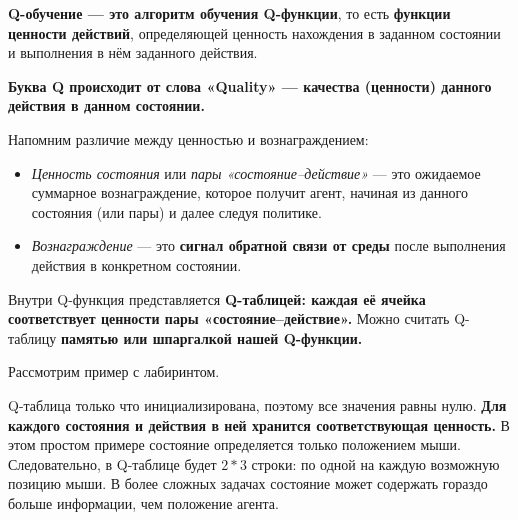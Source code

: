\documentclass[11pt,a4paper]{article}
\begin{document}
\textbf{Q-обучение --- это алгоритм обучения Q-функции}, то есть \textbf{функции ценности действий}, определяющей ценность нахождения в заданном состоянии и выполнения в нём заданного действия.


\textbf{Буква Q происходит от слова «Quality» --- качества (ценности) данного действия в данном состоянии.}

Напомним различие между ценностью и вознаграждением:

\begin{itemize}
\tightlist
\item
  \emph{Ценность состояния} или \emph{пары «состояние--действие»} --- это ожидаемое суммарное вознаграждение, которое получит агент, начиная из данного состояния (или пары) и далее следуя политике.
\item
  \emph{Вознаграждение} --- это \textbf{сигнал обратной связи от среды} после выполнения действия в конкретном состоянии.
\end{itemize}

Внутри Q-функция представляется \textbf{Q-таблицей: каждая её ячейка соответствует ценности пары «состояние--действие».} Можно считать Q-таблицу \textbf{памятью или шпаргалкой нашей Q-функции.}

Рассмотрим пример с лабиринтом.


Q-таблица только что инициализирована, поэтому все значения равны нулю. \textbf{Для каждого состояния и действия в ней хранится соответствующая ценность.} В этом простом примере состояние определяется только положением мыши. Следовательно, в Q-таблице будет \(2*3\) строки: по одной на каждую возможную позицию мыши. В более сложных задачах состояние может содержать гораздо больше информации, чем положение агента.

\end{document}
